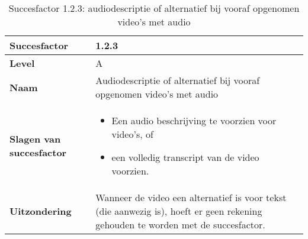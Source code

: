 \begin{table}[H]
    \centering
       \caption{Succesfactor 1.2.3: audiodescriptie of alternatief bij vooraf opgenomen video’s met audio}
    \hspace*{-1cm}\begin{tabular}{|l|p{12cm}|} 
        \hline
        \textbf{Succesfactor}                & 1.2.3                                                                                                                                                                                                                                                                                                             \\ 
        \hline
        \textbf{Level}                       & A                                                                                                                                                                                                                                                                                                                                                                             \\ 
        \hline
        \textbf{Naam}                        & Audiodescriptie of alternatief bij vooraf opgenomen video’s met audio~                                                                                                                                                                                                                                                                                                                                                            \\ 
        \hline
        \textbf{Slagen van succesfactor}     & \begin{itemize}
            \item Een audio beschrijving te voorzien voor video’s, of
            \item een volledig transcript van de video voorzien.
        \end{itemize}                                                                                                                                                                                                      \\ 
        \hline
        \textbf{Uitzondering}     &  Wanneer de video een alternatief is voor tekst (die aanwezig is), hoeft er geen rekening gehouden te worden met de succesfactor.
                                                                                                                                                                                                         \\ 

\end{tabular}
\end{table}

